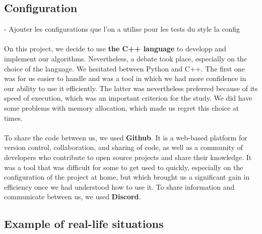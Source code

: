 
\subsection{Configuration}

-  Ajouter les configurations que l'on a utilise pour les tests du style la config\\ \\

On this project, we decide to use \textbf{the C++ language} to developp and implement our algorithms. Nevertheless, a debate took place, especially on the choice of the language. We hesitated between Python and C++. The first one was for us easier to handle and was a tool in which we had more confidence in our ability to use it efficiently. The latter was nevertheless preferred because of its speed of execution, which was an important criterion for the study. We did have some problems with memory allocation, which made us regret this choice at times.  \\ \\
To share the code between us, we used \textbf{Github}\footnotemark {}. It is a web-based platform for version control, collaboration, and sharing of code, as well as a community of developers who contribute to open source projects and share their knowledge. It was a tool that was difficult for some to get used to quickly, especially on the configuration of the project at home, but which brought us a significant gain in efficiency once we had understood how to use it. To share information and communicate between us, we used \textbf{Discord}.




\subsection{Example of real-life situations}

